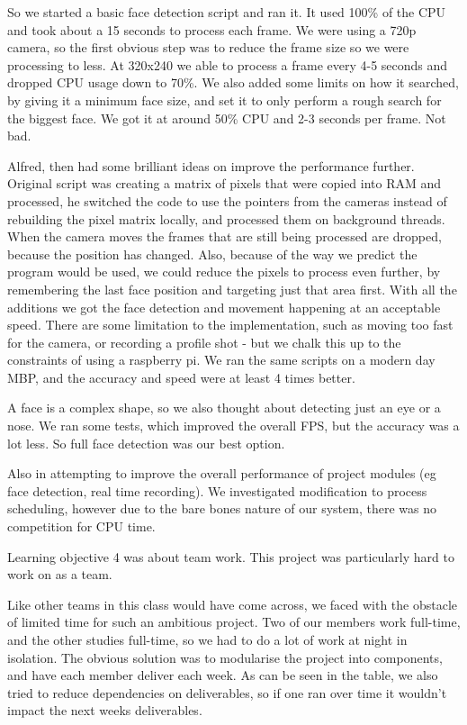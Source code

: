 \documentclass[11pt,a4paper,titlepage]{report}
\begin{document}
\begin{appendices}
So we started a basic face detection script and ran it. It used 100\% of the CPU and took about a 15 seconds to process each frame. We were using a 720p camera, so the first obvious step was to reduce the frame size so we were processing to less. At 320x240 we able to process a frame every 4-5 seconds and dropped CPU usage down to 70\%. We also added some limits on how it searched, by giving it a minimum face size, and set it to only perform a rough search for the biggest face. We got it at around 50\% CPU and 2-3 seconds per frame. Not bad.

Alfred, then had some brilliant ideas on improve the performance further. Original script was creating a matrix of pixels that were copied into RAM and processed, he switched the code to use the pointers from the cameras instead of rebuilding the pixel matrix locally, and processed them on background threads. When the camera moves the frames that are still being processed are dropped, because the position has changed. Also, because of the way we predict the program would be used, we could reduce the pixels to process even further, by remembering the last face position and targeting just that area first. With all the additions we got the face detection and movement happening at an acceptable speed. There are some limitation to the implementation, such as moving too fast for the camera, or recording a profile shot - but we chalk this up to the constraints of using a raspberry pi. We ran the same scripts on a modern day MBP, and the accuracy and speed were at least 4 times better.

A face is a complex shape, so we also thought about detecting just an eye or a nose. We ran some  tests, which improved the overall FPS, but the accuracy was a lot less. So full face detection was our best option. 

Also in attempting to improve the overall performance of project modules (eg face detection, real time recording). We investigated modification to process scheduling, however due to the bare bones nature of our system, there was no competition for CPU time.

Learning objective 4 was about team work. This project was particularly hard to work on as a team. 

Like other teams in this class would have come across, we faced with the obstacle of limited time for such an ambitious project. Two of our members work full-time, and the other studies full-time, so we had to do a lot of work at night in isolation. The obvious solution was to modularise the project into components, and have each member deliver each week. As can be seen in the table, we also tried to reduce dependencies on deliverables, so if one ran over time it wouldn’t impact the next weeks deliverables.


\end{appendices}
\end{document}
